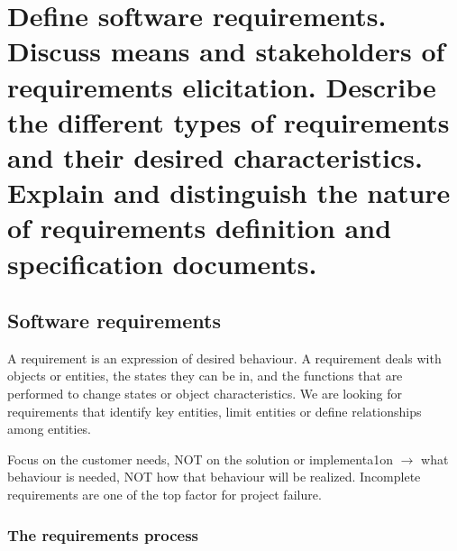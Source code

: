 \clearpage{}
\section{Define software requirements. Discuss means and stakeholders of
requirements elicitation. Describe the different types of requirements and
their desired characteristics. Explain and distinguish the nature of
requirements definition and specification documents.}

\subsection{Software requirements}

A requirement is an expression of desired behaviour. A requirement deals with objects or
entities, the states they can be in, and the functions that are performed to change states or
object characteristics. We are looking for requirements that identify key entities, limit
entities or define relationships among entities. \newline

Focus on the customer needs, NOT on the solution or implementa1on $\rightarrow$ what behaviour is
needed, NOT how that behaviour will be realized. Incomplete requirements are one of the top
factor for project failure.

\subsubsection{The requirements process}


